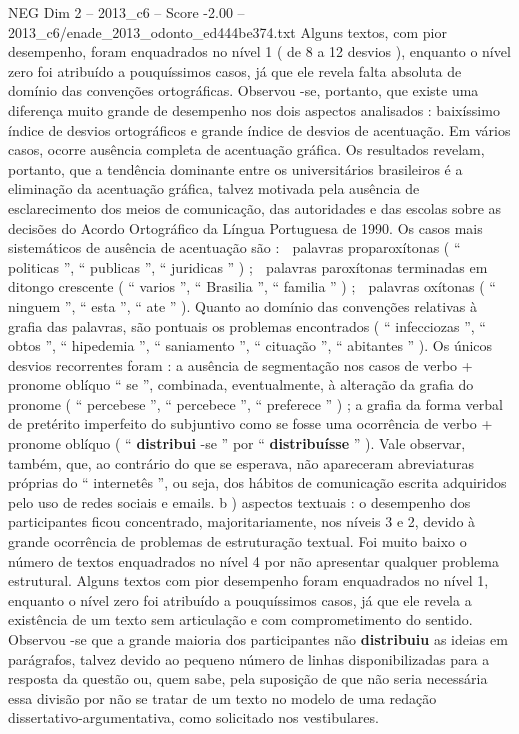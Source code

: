 \begin{textsample}{NEG Dim 2 – 2013\_c6 – Score -2.00 – 2013\_c6/enade\_2013\_odonto\_ed444be374.txt}
Alguns textos, com pior desempenho, foram enquadrados no nível 1 ( de 8 a 12 desvios ), enquanto o nível zero foi atribuído a pouquíssimos casos, já que ele revela falta absoluta de domínio das convenções ortográficas.
Observou -se, portanto, que existe uma diferença muito grande de desempenho nos dois aspectos analisados : baixíssimo índice de desvios ortográficos e grande índice de desvios de acentuação.
Em vários casos, ocorre ausência completa de acentuação gráfica.
Os resultados revelam, portanto, que a tendência dominante entre os universitários brasileiros é a eliminação da acentuação gráfica, talvez motivada pela ausência de esclarecimento dos meios de comunicação, das autoridades e das escolas sobre as decisões do Acordo Ortográfico da Língua Portuguesa de 1990.
Os casos mais sistemáticos de ausência de acentuação são :  palavras proparoxítonas ( “ politicas ”, “ publicas ”, “ juridicas ” ) ;  palavras paroxítonas terminadas em ditongo crescente ( “ varios ”, “ Brasilia ”, “ familia ” ) ;  palavras oxítonas ( “ ninguem ”, “ esta ”, “ ate ” ).
Quanto ao domínio das convenções relativas à grafia das palavras, são pontuais os problemas encontrados ( “ infecciozas ”, “ obtos ”, “ hipedemia ”, “ saniamento ”, “ cituação ”, “ abitantes ” ).
Os únicos desvios recorrentes foram : a ausência de segmentação nos casos de verbo + pronome oblíquo “ se ”, combinada, eventualmente, à alteração da grafia do pronome ( “ percebese ”, “ percebece ”, “ preferece ” ) ; a grafia da forma verbal de pretérito imperfeito do subjuntivo como se fosse uma ocorrência de verbo + pronome oblíquo ( “ \textbf{distribui} -se ” por “ \textbf{distribuísse} ” ).
Vale observar, também, que, ao contrário do que se esperava, não apareceram abreviaturas próprias do “ internetês ”, ou seja, dos hábitos de comunicação escrita adquiridos pelo uso de redes sociais e emails. b ) aspectos textuais : o desempenho dos participantes ficou concentrado, majoritariamente, nos níveis 3 e 2, devido à grande ocorrência de problemas de estruturação textual.
Foi muito baixo o número de textos enquadrados no nível 4 por não apresentar qualquer problema estrutural.
Alguns textos com pior desempenho foram enquadrados no nível 1, enquanto o nível zero foi atribuído a pouquíssimos casos, já que ele revela a existência de um texto sem articulação e com comprometimento do sentido.
Observou -se que a grande maioria dos participantes não \textbf{distribuiu} as ideias em parágrafos, talvez devido ao pequeno número de linhas disponibilizadas para a resposta da questão ou, quem sabe, pela suposição de que não seria necessária essa divisão por não se tratar de um texto no modelo de uma redação dissertativo-argumentativa, como solicitado nos vestibulares.

\end{textsample}
